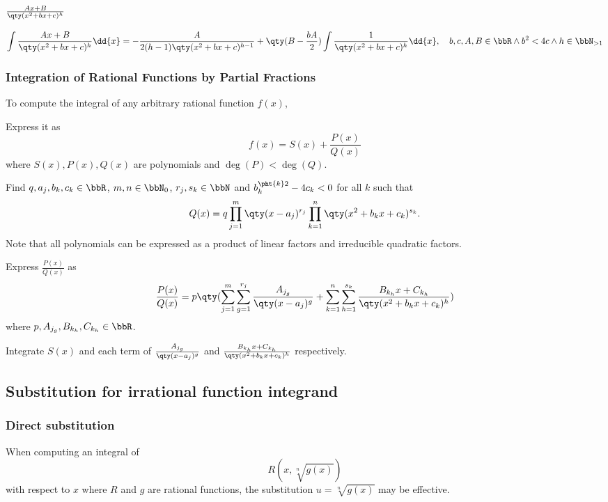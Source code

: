 \subsubsection{$\frac{Ax+B}{\qty(x^2+bx+c)^h}$}
\[\int\frac{Ax+B}{\qty(x^2+bx+c)^h}\dd{x}=-\frac{A}{2(h-1)\qty(x^2+bx+c)^{h-1}}+\qty(B-\frac{bA}{2})\int\frac{1}{\qty(x^2+bx+c)^h}\dd{x},\quad b,c,A,B\in\bbR\land b^2<4c\land h\in\bbN_{>1}\]
\subsubsection{Integration of Rational Functions by Partial Fractions}
To compute the integral of any arbitrary rational function $f(x)$,
\ben
\item Express it as
\[f(x)=S(x)+\frac{P(x)}{Q(x)}\]
where $S(x),P(x),Q(x)$ are polynomials and $\deg(P)<\deg(Q)$.
\item Find $q,a_j,b_k,c_k\in\bbR$, $m,n\in\bbN_0$, $r_j,s_k\in\bbN$ and $b_k^{\pht{k}2}-4c_k<0$ for all $k$ such that
\[Q(x)=q\prod_{j=1}^m\qty(x-a_j)^{r_j}\prod_{k=1}^n\qty(x^2+b_kx+c_k)^{s_k}.\]
Note that all polynomials can be expressed as a product of linear factors and irreducible quadratic factors.
\item Express $\frac{P(x)}{Q(x)}$ as
\[\frac{P(x)}{Q(x)}=p\qty(\sum_{j=1}^m\sum_{g=1}^{r_j}\frac{A_{j_g}}{\qty(x-a_j)^g}+\sum_{k=1}^n\sum_{h=1}^{s_k}\frac{B_{k_h}x+C_{k_h}}{\qty(x^2+b_kx+c_k)^h})\]
where $p,A_{j_g},B_{k_h},C_{k_h}\in\bbR$.
\item Integrate $S(x)$ and each term of $\frac{A_{j_g}}{\qty(x-a_j)^g}$ and $\frac{B_{k_h}x+C_{k_h}}{\qty(x^2+b_kx+c_k)^h}$ respectively.
\een
\subsection{Substitution for irrational function integrand}
\subsubsection{Direct substitution}
When computing an integral of
\[R(x,\sqrt[n]{g(x)})\]
with respect to $x$ where $R$ and $g$ are rational functions, the substitution $u=\sqrt[n]{g(x)}$ may be effective.
